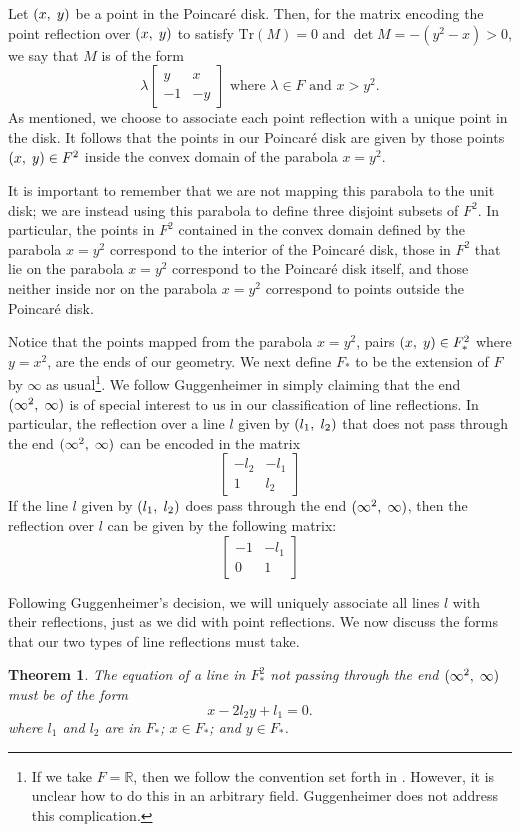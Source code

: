 \documentclass[12pt]{article}
\newcommand{\R}{\mathbb{R}}
\newcommand{\lftmat}[4]{\begin{bmatrix} {#1} & {#2} \\ {#3} & {#4} \end{bmatrix}}
\newcommand{\pointmat}[2]{\lftmat{{#2}}{{#1}}{-1}{-{#2}}}
\newcommand{\stanpointmat}{\pointmat{x}{y}}
\newcommand{\linenoendmat}[2]{\begin{bmatrix} -{#2} & -{#1} \\ 1 & {#2} \end{bmatrix}}
\newcommand{\stanlinenoendmat}{\linenoendmat{l_1}{l_2}}
\newcommand{\lineendmat}[2]{\begin{bmatrix} -1 & -{#1} \\ 0 & 1 \end{bmatrix}}
\newcommand{\stanlineendmat}{\lineendmat{l_1}{l_2}}
\newcommand{\ttc}{, \hspace{1mm}}
\newcommand{\poincare}{Poincar\'{e} }
\newcommand{\Tr}{\text{Tr}}
\newcommand{\specialend}{(\infty^2\ttc\infty)}
\theoremstyle{plain}
\newtheorem{theorem}{Theorem}[section]
\theoremstyle{definition}
\begin{document}
Let $(x \ttc y)$ be a point in the \poincare disk. Then, for the matrix encoding the point reflection over $(x \ttc y)$ to satisfy $\Tr(M) = 0$ and $\det M = -(y^2 - x) > 0$, we say that $M$ is of the form
\begin{equation} 
	\lambda \stanpointmat \text{ where } \lambda \in F \text{ and } x > y^2. 
\end{equation}	
As mentioned, we choose to associate each point reflection with a unique point in the disk. It follows that the points in our \poincare disk are given by those points $(x \ttc y) \in F^2$ inside the convex domain of the parabola $x = y^2$.

It is important to remember that we are not mapping this parabola to the unit disk; we are instead using this parabola to define three disjoint subsets of $F^2$. In particular, the points in $F^2$ contained in the convex domain defined by the parabola $x=y^2$ correspond to the interior of the \poincare disk, those in $F^2$ that lie on the parabola $x=y^2$ correspond to the \poincare disk itself, and those neither inside nor on the parabola $x=y^2$ correspond to points outside the \poincare disk.

Notice that the points mapped from the parabola $x = y^2$, pairs $(x \ttc y) \in F_*^2$ where $y = x^2$, are the ends of our geometry. We next define $F_*$ to be the extension of $F$ by $\infty$ as usual\footnote{If we take $F = \R$, then we follow the convention set forth in \cite{shuman_infinity}. However, it is unclear how to do this in an arbitrary field. Guggenheimer does not address this complication.}. We follow Guggenheimer in simply claiming that the end $\specialend$ is of special interest to us in our classification of line reflections. In particular, the reflection over a line $l$ given by $(l_1\ttc l_2)$ that does not pass through the end $\specialend$ can be encoded in the matrix
\[\stanlinenoendmat\]
If the line $l$ given by $(l_1\ttc l_2)$ does pass through the end $\specialend$, then the reflection over $l$ can be given by the following matrix:
\[
	\stanlineendmat
\]

Following Guggenheimer's decision, we will uniquely associate all lines $l$ with their reflections, just as we did with point reflections. We now discuss the forms that our two types of line reflections must take.

\begin{theorem}The equation of a line in $F_*^2$ not passing through the end $\specialend$ must be of the form \begin{equation}
	x - 2l_2y + l_1  = 0.
\end{equation} 
where $l_1$ and $l_2$ are in $F_*$; $x \in F_*$; and $y \in F_*$.
\end{theorem}
\end{document}
